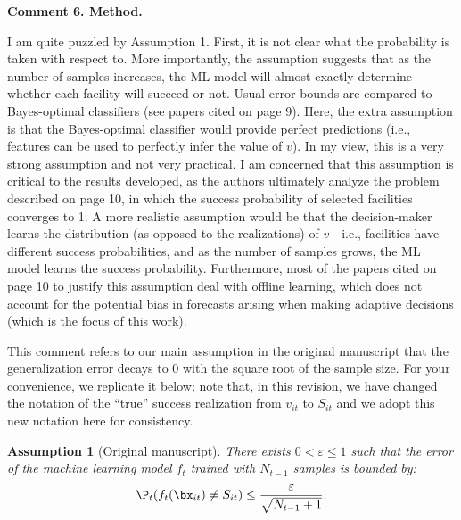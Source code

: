 \documentclass[11pt]{article}
\newtheorem{assumption}{Assumption}[]
\begin{document}
\begin{commentBox}
\textbf{Comment 6. Method.}\label{R1:6}

    I am quite puzzled by Assumption 1. First, it is not clear what the probability is taken with respect to. More importantly, the assumption suggests that as the number of samples increases, the ML model will almost exactly determine whether each facility will succeed or not. Usual error bounds are compared to Bayes-optimal classifiers (see papers cited on page 9). Here, the extra assumption is that the Bayes-optimal classifier would provide perfect predictions (i.e., features can be used to perfectly infer the value of $v$). In my view, this is a very strong assumption and not very practical. I am concerned that this assumption is critical to the results developed, as the authors ultimately analyze the problem described on page 10, in which the success probability of selected facilities converges to 1. A more realistic assumption would be that the decision-maker learns the distribution (as opposed to the realizations) of $v$—i.e., facilities have different success probabilities, and as the number of samples grows, the ML model learns the success probability. Furthermore, most of the papers cited on page 10 to justify this assumption deal with offline learning, which does not account for the potential bias in forecasts arising when making adaptive decisions (which is the focus of this work).
\end{commentBox}

This comment refers to our main assumption in the original manuscript that the generalization error decays to 0 with the square root of the sample size. For your convenience, we replicate it below; note that, in this revision, we have changed the notation of the ``true'' success realization from $v_{it}$ to $S_{it}$ and we adopt this new notation here for consistency.
\setcounter{assumption}{0}
\begin{assumption}[Original manuscript] \label{ass:classification_old_R1}
    There exists $0<\varepsilon\leq 1$ such that the error of the machine learning model $f_t$ trained with $N_{t-1}$ samples is bounded by:
    \begin{align*}
         \P_{t}(f_t(\bx_{it})\neq S_{it})\leq \frac{\varepsilon }{\sqrt{N_{t-1} + 1}}.
    \end{align*}
    
\end{assumption}
\end{document}
